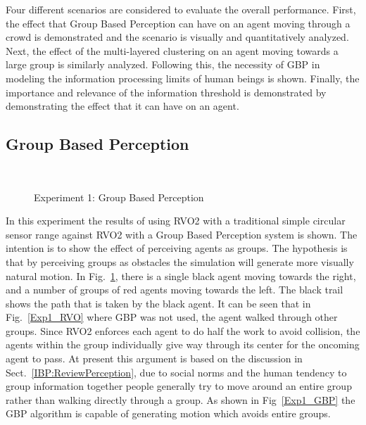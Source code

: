 Four different scenarios are considered to evaluate the overall performance. First, the effect that Group Based Perception can have on an agent moving through a crowd is demonstrated and the scenario is visually and quantitatively analyzed. Next, the effect of the multi-layered clustering on an agent moving towards a large group is similarly analyzed. Following this, the necessity of GBP in modeling the information processing limits of human beings is shown. Finally, the importance and relevance of the information threshold is demonstrated by demonstrating the effect that it can have on an agent.

\subsection{Group Based Perception}
\label{GBP}

\begin{figure}[!tb]
  \centering
  \\
   \caption{Experiment 1: Group Based Perception}
  \label{Exp1}
\end{figure}


In this experiment the results of using RVO2 with a traditional simple circular sensor range against RVO2 with a Group Based Perception system is shown. The intention is to show the effect of perceiving agents as groups. The hypothesis is that by perceiving groups as obstacles the simulation will generate more visually natural motion. In Fig.~\ref{Exp1}, there is a single black agent moving towards the right, and a number of groups of red agents moving towards the left. The black trail shows the path that is taken by the black agent. It can be seen that in Fig.~\ref{Exp1_RVO} where GBP was not used, the agent walked through other groups. Since RVO2 enforces each agent to do half the work to avoid collision, the agents within the group individually give way through its center for the oncoming agent to pass. At present this argument is based on the discussion in Sect.~\ref{IBP:ReviewPerception}, due to social norms and the human tendency to group information together people generally try to move around an entire group rather than walking directly through a group. As shown in Fig~\ref{Exp1_GBP} the GBP algorithm is capable of generating motion which avoids entire groups.

